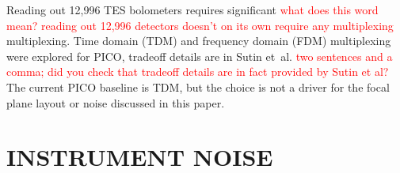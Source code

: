 \documentclass[]{spie}  %
\newcommand{\comr}[1]{\textcolor{red}{#1}}
\begin{document}
Reading out 12,996 TES bolometers requires significant \comr{what does this word mean? reading out 12,996
detectors doesn't on its own require any multiplexing} multiplexing.  
Time domain (TDM) and frequency domain (FDM) 
multiplexing were explored for PICO, tradeoff details are in Sutin et~al.\cite{brian_spie} \comr{two sentences 
and a comma; did you check that tradeoff details are in fact provided by Sutin et al? }
The current PICO baseline is TDM, 
but the choice is not a driver for the focal plane layout or noise discussed in this paper.









\section{INSTRUMENT NOISE}
\label{sec:noise}
\end{document}
